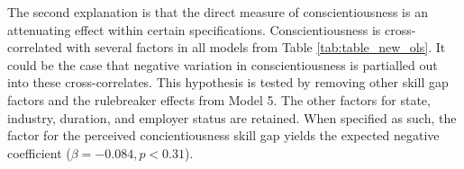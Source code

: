 \documentclass[review]{elsarticle}
\begin{document}

The second explanation is that the direct measure of conscientiousness is an attenuating effect within certain specifications.
Conscientiousness is cross-correlated with several factors in all models from Table \ref{tab:table_new_ols}.
%
It could be the case that negative variation in conscientiousness is partialled out into these cross-correlates.
This hypothesis is tested by removing other skill gap factors and the rulebreaker effects from Model 5.
The other factors for state, industry, duration, and employer status are retained.
When specified as such, the factor for the perceived concientiousness skill gap yields the expected negative coefficient ($\beta = -0.084, p < 0.31$).
\end{document}
